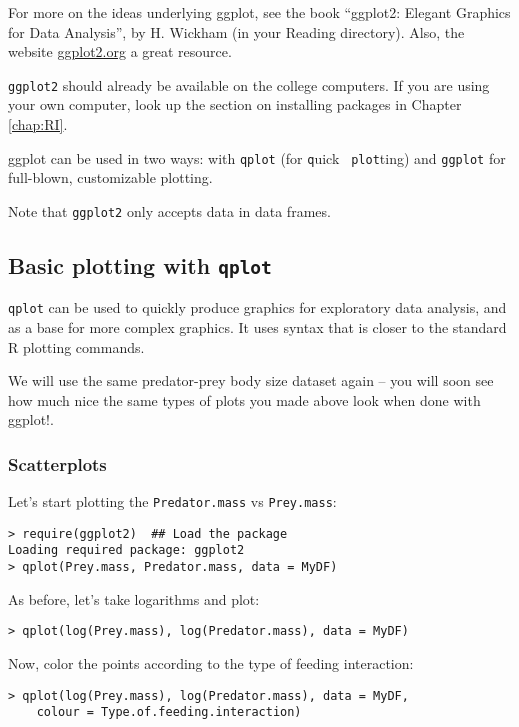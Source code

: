 For more on the ideas underlying ggplot, see the book ``ggplot2: 
Elegant Graphics for Data Analysis'', by H. Wickham (in your Reading 
directory). Also, the website \url{ ggplot2.org} a great resource. 

{\tt ggplot2} should already be available on the college computers. If 
you are using your own computer, look up the section on installing 
packages in Chapter \ref{chap:RI}. 

ggplot can be used in two ways: with {\tt qplot} (for {\tt q}uick {\tt 
plot}ting) and {\tt ggplot} for full-blown, customizable plotting.

\begin{tipbox}
Note that {\tt ggplot2} only accepts data in data frames. 	
\end{tipbox}

\subsection{Basic plotting with {\tt qplot}}

{\tt qplot} can be used to quickly produce graphics for exploratory 
data analysis, and as a base for more complex graphics. It uses syntax 
that is closer to the standard R plotting commands. 

We will use the same predator-prey body size dataset again -- you will 
soon see how much nice the same types of plots you made above look when 
done with ggplot!. 

\subsubsection{Scatterplots}

Let's start plotting the {\tt Predator.mass} vs {\tt Prey.mass}:
\begin{lstlisting}
> require(ggplot2)  ## Load the package
Loading required package: ggplot2
> qplot(Prey.mass, Predator.mass, data = MyDF)
\end{lstlisting}

As before, let's take logarithms and plot:

\begin{lstlisting}
> qplot(log(Prey.mass), log(Predator.mass), data = MyDF)
\end{lstlisting}

Now, color the points according to the type of feeding interaction:

\begin{lstlisting}
> qplot(log(Prey.mass), log(Predator.mass), data = MyDF, 
	colour = Type.of.feeding.interaction)
\end{lstlisting}

